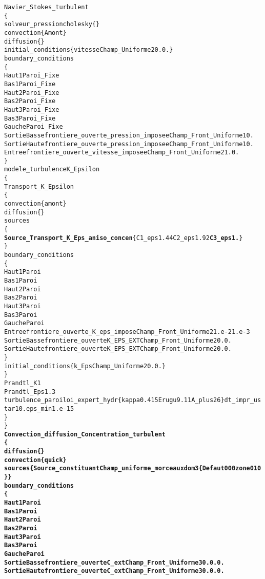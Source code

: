 \begin{alltt}
    Navier_Stokes_turbulent
    \{
        solveur_pression cholesky \{ \}
        convection \{ Amont \}
        diffusion \{ \}
        initial_conditions \{ vitesse Champ_Uniforme 2 0. 0. \}
        boundary_conditions
        \{
             Haut1 Paroi_Fixe
             Bas1 Paroi_Fixe
             Haut2 Paroi_Fixe
             Bas2 Paroi_Fixe
             Haut3 Paroi_Fixe
             Bas3 Paroi_Fixe
             Gauche Paroi_Fixe
             SortieBasse frontiere_ouverte_pression_imposee Champ_Front_Uniforme 1 0.
             SortieHaute frontiere_ouverte_pression_imposee Champ_Front_Uniforme 1 0.
             Entree frontiere_ouverte_vitesse_imposee Champ_Front_Uniforme 2  1. 0.
        \}
        modele_turbulence K_Epsilon
        \{
            Transport_K_Epsilon 
            \{
                convection \{ amont \}
                diffusion \{ \}
                sources 
                \{ 
                  {\bf{Source_Transport_K_Eps_aniso_concen}} \{ C1_eps 1.44 C2_eps 1.92 {\bf{C3_eps 1.}} \}
                \}
                boundary_conditions
                \{
                    Haut1 Paroi
                    Bas1 Paroi
                    Haut2 Paroi
                    Bas2 Paroi
                    Haut3 Paroi
                    Bas3 Paroi
                    Gauche Paroi
                    Entree frontiere_ouverte_K_eps_impose Champ_Front_Uniforme 2 1.e-2 1.e-3
                    SortieBasse frontiere_ouverte K_EPS_EXT Champ_Front_Uniforme 2 0. 0.
                    SortieHaute frontiere_ouverte K_EPS_EXT Champ_Front_Uniforme 2 0. 0.
                \}
                initial_conditions \{ k_Eps Champ_Uniforme 2 0. 0. \}
             \}
             Prandtl_K 1
             Prandtl_Eps 1.3
             turbulence_paroi loi_expert_hydr \{ kappa 0.415 Erugu 9.11 A_plus 26 \} dt_impr_ustar 10. eps_min 1.e-15
        \}
    \}
    {\bf{Convection_diffusion_Concentration_turbulent }}
    {\bf{\{ }}
        {\bf{diffusion \{ \} }}
        {\bf{convection \{ quick \} }}
        {\bf{sources \{ Source_constituant Champ_uniforme_morceaux dom 3 \{ Defaut 0 0 0 zone 0 1 0 \} \} }}
        {\bf{boundary_conditions }}
        {\bf{\{ }}
             {\bf{Haut1          Paroi }}
             {\bf{Bas1           Paroi }}
             {\bf{Haut2          Paroi }}
             {\bf{Bas2           Paroi }}
             {\bf{Haut3          Paroi }}
             {\bf{Bas3           Paroi }}
             {\bf{Gauche         Paroi }}
             {\bf{SortieBasse    frontiere_ouverte C_ext Champ_Front_Uniforme 3 0. 0. 0. }}
             {\bf{SortieHaute    frontiere_ouverte C_ext Champ_Front_Uniforme 3 0. 0. 0. }}

\end{alltt}
